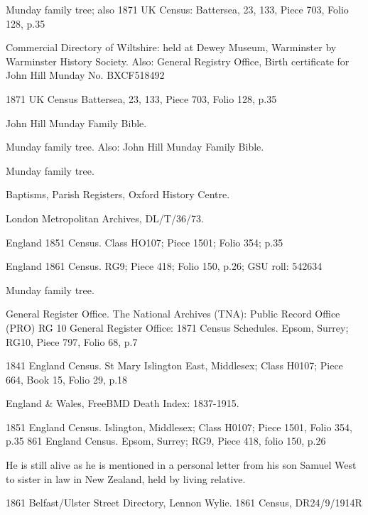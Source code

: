 \begin{thebibliography}{99}
	Munday family tree; also
	1871 UK Census: Battersea, 23, 133, Piece 703, Folio 128, p.35 
	
	Commercial Directory of Wiltshire: held at Dewey Museum, Warminster by Warminster History Society.
	Also: General Registry Office, Birth certificate for John Hill Munday No. BXCF518492
	
	1871 UK Census
	Battersea, 23, 133, Piece 703, Folio 128, p.35
	
	John Hill Munday Family Bible.
	
	Munday family tree. Also:
	John Hill Munday Family Bible. 
	
	Munday family tree. 
	
	 Baptisms, Parish Registers, Oxford History Centre.
	 
	 London Metropolitan Archives, DL/T/36/73. 
	 
	England 1851 Census.
	Class HO107; Piece 1501; Folio 354; p.35
	
	England 1861 Census.
	RG9; Piece 418; Folio 150, p.26; GSU roll: 542634
	
	Munday family tree.
	
	General Register Office. The National Archives (TNA): Public Record Office (PRO) RG 10 General Register Office: 1871 Census Schedules.
	Epsom, Surrey; RG10, Piece 797, Folio 68, p.7
	
	1841 England Census.
	St Mary Islington East, Middlesex; Class H0107; Piece 664, Book 15, Folio 29, p.18
	
	England \& Wales, FreeBMD Death Index: 1837-1915.
	
	1851 England Census.
	Islington, Middlesex; Class H0107; Piece 1501, Folio 354, p.35
	861 England Census.
	Epsom, Surrey; RG9, Piece 418, folio 150, p.26
	
	He is still alive as he is mentioned in a personal letter from his son Samuel West to sister in law
	in New Zealand, held by living relative.
	
	1861 Belfast/Ulster Street Directory, Lennon Wylie.
	1861 Census, DR24/9/1914R 


\end{thebibliography}
